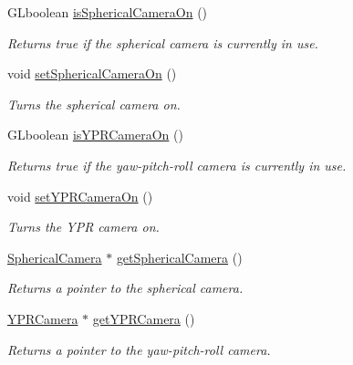 \begin{DoxyCompactItemize}
G\+Lboolean \hyperlink{class_graphics_engine_a45375adf56d4769b0f33206dc760a1f6}{is\+Spherical\+Camera\+On} ()
\begin{DoxyCompactList}\small\item\em Returns true if the spherical camera is currently in use. \end{DoxyCompactList}\item 
\mbox{\label{class_graphics_engine_a82227c52191595cf7ca7aaea82396a01}} 
void \hyperlink{class_graphics_engine_a82227c52191595cf7ca7aaea82396a01}{set\+Spherical\+Camera\+On} ()
\begin{DoxyCompactList}\small\item\em Turns the spherical camera on. \end{DoxyCompactList}\item 
G\+Lboolean \hyperlink{class_graphics_engine_a8ed6b779b8696620241ba701afd6de67}{is\+Y\+P\+R\+Camera\+On} ()
\begin{DoxyCompactList}\small\item\em Returns true if the yaw-\/pitch-\/roll camera is currently in use. \end{DoxyCompactList}\item 
\mbox{\label{class_graphics_engine_a322229c8ad08ee37b26c047761ca7b80}} 
void \hyperlink{class_graphics_engine_a322229c8ad08ee37b26c047761ca7b80}{set\+Y\+P\+R\+Camera\+On} ()
\begin{DoxyCompactList}\small\item\em Turns the Y\+PR camera on. \end{DoxyCompactList}\item 
\mbox{\label{class_graphics_engine_a08fa5ea5485b0bab2d902dd71ac995d9}} 
\hyperlink{class_spherical_camera}{Spherical\+Camera} $\ast$ \hyperlink{class_graphics_engine_a08fa5ea5485b0bab2d902dd71ac995d9}{get\+Spherical\+Camera} ()
\begin{DoxyCompactList}\small\item\em Returns a pointer to the spherical camera. \end{DoxyCompactList}\item 
\mbox{\label{class_graphics_engine_a99c1b6f36ce3c8e02cba2a97b08eab05}} 
\hyperlink{class_y_p_r_camera}{Y\+P\+R\+Camera} $\ast$ \hyperlink{class_graphics_engine_a99c1b6f36ce3c8e02cba2a97b08eab05}{get\+Y\+P\+R\+Camera} ()
\begin{DoxyCompactList}\small\item\em Returns a pointer to the yaw-\/pitch-\/roll camera. \end{DoxyCompactList}\end{DoxyCompactItemize}


